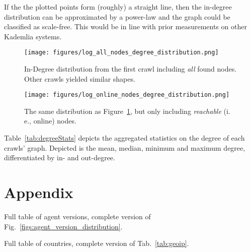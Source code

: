\documentclass[10pt]{article}
\makeatletter
\newcommand*{\ie}{i.\,e.\@\xspace}
\makeatother
\begin{document}
If the the plotted points form (roughly) a straight line, then the in-degree distribution can be approximated by a power-law and the graph could be classified as scale-free.
This would be in line with prior measurements on other Kademlia systems.

\begin{figure}[!htb]
\centering
        \texttt{[image: figures/log\_all\_nodes\_degree\_distribution.png]}
        \caption{In-Degree distribution from the first crawl including \emph{all} found nodes. Other crawls yielded similar shapes.}
        \label{fig:log_all_nodes_degree_distribution}
\end{figure}
\begin{figure}[!htb]
        \texttt{[image: figures/log\_online\_nodes\_degree\_distribution.png]}
        \caption{The same distribution as Figure~\ref{fig:log_all_nodes_degree_distribution}, but only including \emph{reachable} (\ie, online) nodes.}
        \label{fig:log_online_nodes_degree_distribution}
\end{figure}

Table~\ref{tab:degreeStats} depicts the aggregated statistics on the degree of each crawls' graph.
Depicted is the mean, median, minimum and maximum degree, differentiated by in- and out-degree.

%

\section*{Appendix}
\label{sec:appendix}

Full table of agent versions, complete version of Fig.~\ref{figs:agent_version_distribution}.


Full table of countries, complete version of Tab.~\ref{tab:geoip}.

\end{document}
